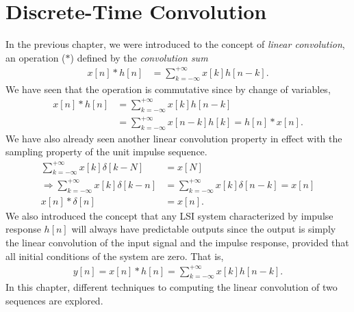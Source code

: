 \documentclass{report}
\begin{document}
\setcounter{chapter}{2}
\setcounter{page}{19}
\chapter{Discrete-Time Convolution}

In the previous chapter, we were introduced to the concept of \emph{linear convolution}, an operation ($*$) defined by the \emph{convolution sum}
\begin{align*}
    x[n] * h[n] &= \sum_{k=-\infty}^{+\infty} x[k]h[n-k].
\end{align*}
We have seen that the operation is commutative since by change of variables, 
\begin{align*}
    x[n] * h[n] &= \sum_{k=-\infty}^{+\infty} x[k]h[n-k] \\
    &= \sum_{k=-\infty}^{+\infty} x[n-k]h[k] = h[n] * x[n].
\end{align*}
We have also already seen another linear convolution property in effect with the sampling property of the unit impulse sequence. 
\begin{align*}
    \sum_{k=-\infty}^{+\infty} x[k]\delta[k-N] &= x[N] \\
    \Longrightarrow \sum_{k=-\infty}^{+\infty} x[k]\delta[k-n] &= \sum_{k=-\infty}^{+\infty} x[k]\delta[n-k] = x[n] \\
    x[n] * \delta[n] &= x[n].
\end{align*}
We also introduced the concept that any LSI system characterized by impulse response $h[n]$ will always have predictable outputs since the output is simply the 
linear convolution of the input signal and the impulse response, provided that all initial conditions of the system are zero. That is, 
\begin{align}
    y[n] = x[n] * h[n] = \sum_{k=-\infty}^{+\infty} x[k]h[n-k].
\end{align}
In this chapter, different techniques to computing the linear convolution of two sequences are explored.
\end{document}
